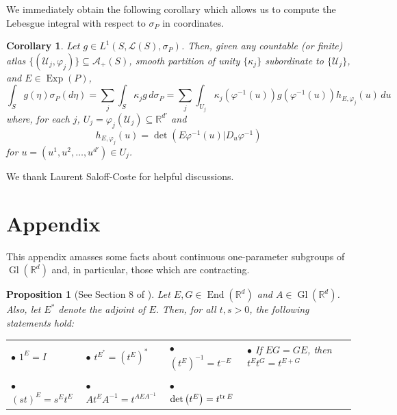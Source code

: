 \documentclass[11pt]{article}
\newtheorem{corollary}[theorem]{Corollary}
\newtheorem{proposition}[theorem]{Proposition}
\theoremstyle{remark}
\newcommand\End{\operatorname{End}} %
\newcommand\Gl{\operatorname{Gl}} %
\newcommand\Exp{\operatorname{Exp}}
\renewcommand\det{\operatorname{det}}
\begin{document}
\noindent We immediately obtain the following corollary which allows us to compute the Lebesgue integral with respect to $\sigma_P$ in coordinates.
\begin{corollary}\label{cor:IntegralFormula}
Let $g\in L^1(S,\mathcal{L}(S),\sigma_P)$. Then, given any  countable (or finite) atlas $\{(\mathcal{U}_j,\varphi_j)\}\subseteq\mathcal{A}_+(S)$,  smooth partition of unity $\{\kappa_j\}$ subordinate to $\{\mathcal{U}_j\}$, and $E\in\Exp(P)$,
\begin{equation*}
\int_S g(\eta)\sigma_P(d\eta)=\sum_{j}\int_S \kappa_jg\,d\sigma_P=\sum_j\int_{U_j}\kappa_j(\varphi^{-1}(u))g(\varphi^{-1}(u))h_{E,\varphi_j}(u)\,du
\end{equation*}
where, for each $j$, $U_j=\varphi_j(\mathcal{U}_j)\subseteq\mathbb{R}^{d'}$ and
\begin{equation*}
    h_{E,\varphi_j}(u)=\det(E\varphi^{-1}(u)\vert D_u\varphi^{-1})
\end{equation*}
for $u=(u^1,u^2,\dots,u^{d'})\in U_j$. 
\end{corollary}

\vspace{.4cm}
 We thank Laurent Saloff-Coste for helpful discussions.



\appendix
\section{Appendix} %


This appendix amasses some facts about continuous one-parameter subgroups of $\Gl(\mathbb{R}^d)$ and, in particular, those which are contracting.


\begin{proposition}[See Section 8 of \cite{randles_convolution_2017}]\label{prop:ContinuousGroupProperties}
Let $E,G\in\End(\mathbb{R}^d)$ and $A\in\Gl(\mathbb{R}^d)$. Also, let $E^*$ denote the adjoint of $E$. Then, for all $t,s>0$, the following statements hold:

\vspace{.3cm}
\begin{tabular}{lllll}
$\bullet$ $1^E=I$ &  $\bullet$ $t^{E^*}=(t^E)^*$ & $\bullet$ $(t^E)^{-1}=t^{-E}$ &   $\bullet$ If $EG=GE$, then $t^Et^G=t^{E+G}$\\
\vspace{.1cm}\\
$\bullet$ $(st)^E=s^Et^E$ & $\bullet$ $At^EA^{-1}=t^{AEA^{-1}}$&  $\bullet$ $\det\left(t^E\right)=t^{\tr E}$\\
\end{tabular}
\end{proposition}
\end{document}
